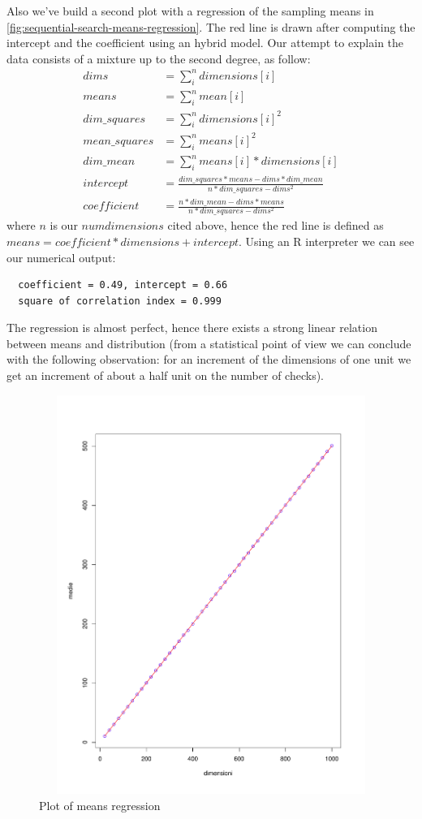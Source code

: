 Also we've build a second plot with a regression of the sampling means in
\autoref{fig:sequential-search-means-regression}. The red line is
drawn after computing the intercept and the coefficient using an
hybrid model. Our attempt to explain the data consists of a mixture up
to the second degree, as follow:
\begin{displaymath}
  \begin{split}
    dims &= \sum_{i}^{n}{dimensions[i]}\\
    means &= \sum_{i}^{n}{mean[i]}\\
    dim\_squares &= \sum_{i}^{n}{dimensions[i]^2}\\
    mean\_squares &= \sum_{i}^{n}{means[i]^2}\\
    dim\_mean &= \sum_{i}^{n}{means[i] * dimensions[i]}\\
    intercept &= \frac{dim\_squares * means - dims *
      dim\_mean}{n*dim\_squares - dims^2}\\
    coefficient &= \frac{n * dim\_mean - dims * means} {n*dim\_squares-dims^2}
  \end{split}
\end{displaymath}
where $n$ is our $numdimensions$ cited above, hence the red line is
defined as $means = coefficient*dimensions + intercept$. Using an R
interpreter we can see our numerical output:
\begin{lstlisting}
  coefficient = 0.49, intercept = 0.66
  square of correlation index = 0.999
\end{lstlisting}
The regression is almost perfect, hence there exists a strong linear
relation between means and distribution (from a statistical point of
view we can conclude with the following observation: for an increment
of the dimensions of one unit we get an increment of about a half unit
on the number of checks).
\begin{figure}[htb]
\centering
\includegraphics[height=13cm,width=13cm]{pictures/sequential-search-mean-regression-of-sequential-search.pdf}
\caption{Plot of means regression}
\label{fig:sequential-search-means-regression}
\end{figure}
